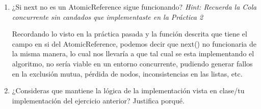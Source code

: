 \begin{enumerate}
\begin{enumerate}
        \item ¿Si next no es un AtomicReference sigue funcionando? \textit{Hint: Recuerda la Cola concurrente sin candados que implementaste en la Práctica 2}

        Recordando lo visto en la práctica pasada y la función descrita que tiene el campo en si del AtomicReference, podemos decir que next() no funcionaria de la misma manera, lo cual nos llevaría a que tal cual se esta implementando el algoritmo, no sería viable en un entorno concurrente, pudiendo generar fallos en la exclusión mutua, pérdida de nodos, inconsistencias en las listas, etc.\\

        \item ¿Consideras que mantiene la lógica de la implementación vista en clase/tu implementación del ejercicio anterior? Justifica porqué.

        
    \end{enumerate}
\end{enumerate}
